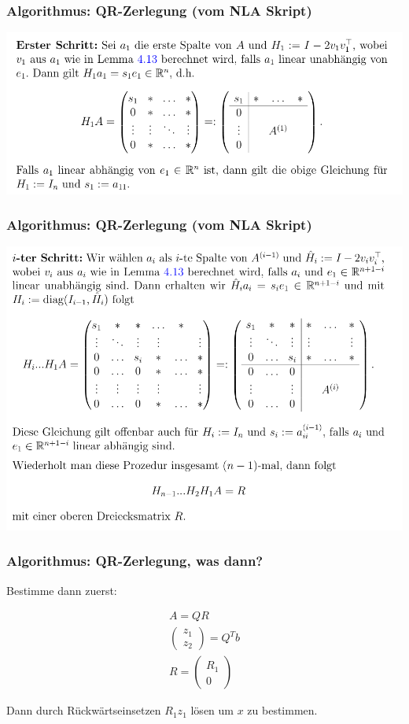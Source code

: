 \documentclass{beamer}
\begin{document}
\begin{frame}
\frametitle{Algorithmus: QR-Zerlegung (vom NLA Skript)}
\includegraphics[width=\textwidth]{alg1.png}
\end{frame}

\begin{frame}
\frametitle{Algorithmus: QR-Zerlegung (vom NLA Skript)}
\includegraphics[width=\textwidth]{alg2.png}
\end{frame}

\begin{frame}
\frametitle{Algorithmus: QR-Zerlegung, was dann?}

Bestimme dann zuerst:

\begin{align*}
A = QR \\
\begin{pmatrix}
z_1 \\
z_2
\end{pmatrix} = Q^T b \\
R = \begin{pmatrix}
R_1 \\
0
\end{pmatrix}
\end{align*}

Dann durch Rückwärtseinsetzen $R_1 z_1$ lösen um $x$ zu bestimmen.

\end{frame}
\end{document}

